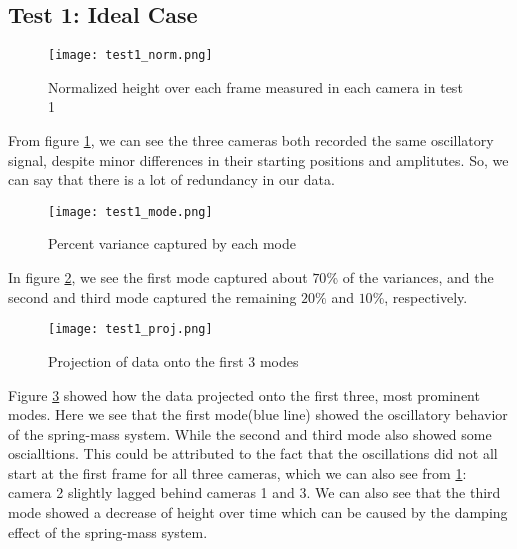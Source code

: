 \documentclass[12pt, a4paper]{article}
\begin{document}
\subsection{Test 1: Ideal Case}
\begin{figure}[H]
    \centering
    \texttt{[image: test1\_norm.png]}
    \caption{Normalized height over each frame measured in each camera in test 1}
    \label{fig:1norm}
\end{figure}
From figure \ref{fig:1norm}, we can see the three cameras both recorded the same oscillatory signal, despite minor differences in their starting positions and amplitutes. So, we can say that there is a lot of redundancy in our data. 
\begin{figure}[H]
    \centering
    \texttt{[image: test1\_mode.png]}
    \caption{Percent variance captured by each mode}
    \label{fig:1mode}
\end{figure}
In figure \ref{fig:1mode}, we see the first mode captured about $70\%$ of the variances, and the second and third mode captured the remaining $20\%$ and $10\%$, respectively.
\begin{figure}[H]
    \centering
    \texttt{[image: test1\_proj.png]}
    \caption{Projection of data onto the first 3 modes}
    \label{fig:1proj}
\end{figure}
Figure \ref{fig:1proj} showed how the data projected onto the first three, most prominent modes. Here we see that the first mode(blue line) showed the oscillatory behavior of the spring-mass system. While the second and third mode also showed some oscialltions. This could be attributed to the fact that the oscillations did not all start at the first frame for all three cameras, which we can also see from \ref{fig:1norm}: camera 2 slightly lagged behind cameras 1 and 3. We can also see that the third mode showed a decrease of height over time which can be caused by the damping effect of the spring-mass system.
\end{document}
